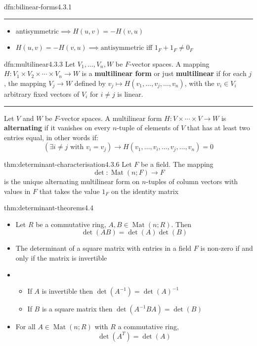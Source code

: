 \documentclass[landscape, 8pt]{extarticle}
\DeclareMathOperator{\Mat}{Mat}
\begin{document}
\begin{multicols}{3}
\begin{dfn}{dfn:bilinear-forms}{4.3.1}
    \noindent\rule{\textwidth}{0.2pt}
    \begin{itemize}
        \item antisymmetric$\implies H(u, v) = -H(v, u)$
        \item $H(u, v) = -H(v, u) \implies \text{antisymmetric}$ iff $1_{F} + 1_{F} \ne 0_{F}$
    \end{itemize}
\end{dfn}

\begin{dfn}{dfn:multilinear}{4.3.3}
    Let $V_{1},\dots,V_{n}, W$ be $F$-vector spaces. A mapping $H : V_{1} \times V_{2} \times \cdots \times V_{n} \to W$ is a \textbf{multilinear form} or just \textbf{multilinear} if for each $j$, the mapping $V_{j}\to W$ defined by $v_{j}\mapsto H(v_{1},\dots,v_{j},\dots,v_{n})$, with the $v_{i}\in V_{i}$ arbitrary fixed vectors of $V_{i}$ for $i\ne j$ is linear. 

    \noindent\rule{\textwidth}{0.2pt}
    Let $V$ and $W$ be $F$-vector spaces. A multilinear form $ H : V \times \cdots \times V \to W$ is \textbf{alternating} if it vanishes on every $n$-tuple of elements of $V$ that has at least two entries equal, in other words if:
    \[(\exists i\ne j \text{ with } v_{i} = v_{j})\to H(v_{1},\dots,v_{i},\dots,v_{j},\dots,v_{n}) = 0\]
\end{dfn}

\begin{thm}{thm:determinant-characterisation}{4.3.6}
    Let $F$ be a field. The mapping
    \[\det : \Mat(n;F) \to F\]
    is the unique alternating multilinear form on $n$-tuples of column vectors with values in $F$ that takes the value $1_{F}$ on the identity matrix
\end{thm}

\begin{thm}{thm:determinant-theorems}{4.4}
    \begin{itemize}
        \item[\textbf{4.4.1}:] Let $R$ be a commutative ring, $A, B\in \Mat(n; R)$. Then
            \[\det(AB) = \det(A)\det(B)\]
        \item[\textbf{4.4.2}:] The determinant of a square matrix with entries in a field $F$ is non-zero if and only if the matrix is invertible
        \item[\textbf{4.4.3}:] \begin{itemize}
            \item If $A$ is invertible then $\det(A^{-1}) = \det(A)^{-1}$
            \item If $B$ is a square matrix then $\det(A^{-1}BA) = \det(B)$
        \end{itemize} 
        \item[\textbf{4.4.4}:] For all $A\in \Mat(n;R)$ with $R$ a commutative ring,
    \[\det(A^{T}) = \det(A)\]


\end{itemize}
\end{thm}
\end{multicols}
\end{document}
